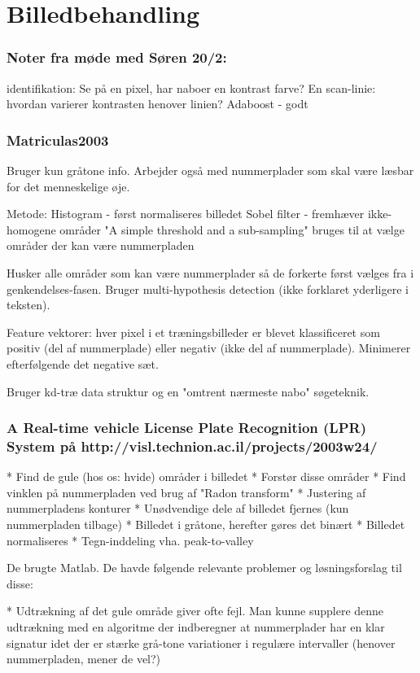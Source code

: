 \section{Billedbehandling}


\subsubsection*{Noter fra møde med Søren 20/2:}
identifikation: Se på en pixel, har naboer en kontrast farve?
En scan-linie: hvordan varierer kontrasten henover linien?
Adaboost - godt

\subsubsection*{Matriculas2003}
Bruger kun gråtone info. Arbejder også med nummerplader som skal være læsbar for det menneskelige øje.

Metode:
Histogram - først normaliseres billedet
Sobel filter - fremhæver ikke-homogene områder
"A simple threshold and a sub-sampling" bruges til at vælge områder der kan være nummerpladen

Husker alle områder som kan være nummerplader så de forkerte først vælges fra i genkendelses-fasen. Bruger multi-hypothesis detection (ikke forklaret yderligere i teksten).

Feature vektorer: hver pixel i et træningsbilleder er blevet klassificeret som positiv (del af nummerplade) eller negativ (ikke del af nummerplade). Minimerer efterfølgende det negative sæt.

Bruger kd-træ data struktur og en "omtrent nærmeste nabo" søgeteknik.

\subsubsection*{A Real-time vehicle License Plate Recognition (LPR) System på http://visl.technion.ac.il/projects/2003w24/}

* Find de gule (hos os: hvide) områder i billedet
* Forstør disse områder
* Find vinklen på nummerpladen ved brug af "Radon transform"
* Justering af nummerpladens konturer
* Unødvendige dele af billedet fjernes (kun nummerpladen tilbage)
* Billedet i gråtone, herefter gøres det binært
* Billedet normaliseres
* Tegn-inddeling vha. peak-to-valley

De brugte Matlab. De havde følgende relevante problemer og løsningsforslag til disse:

* Udtrækning af det gule område giver ofte fejl. Man kunne supplere denne udtrækning med en algoritme der indberegner at nummerplader har en klar signatur idet der er stærke grå-tone variationer i regulære intervaller (henover nummerpladen, mener de vel?)

